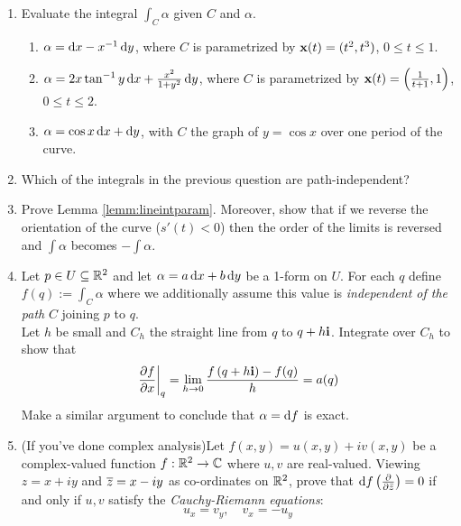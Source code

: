 \begin{exercises}
\begin{enumerate}
	  \item Evaluate the integral $\int_C\alpha$ given $C$ and $\alpha$.\vspace{-6pt}
	  \begin{enumerate}\itemsep2pt
	    \item $\alpha=\dx-x^{-1}\,\dy$, where $C$ is parametrized by $\vx(t)=(t^2,t^3)$, $0\le t\le 1$.
	    \item $\alpha=2x\tan^{-1}y\,\dx+\frac{x^2}{1+y^2}\,\dy$, where $C$ is parametrized by $\vx(t)=\left(\frac 1{t+1},1\right)$, $0\le t\le 2$.
	    \item $\alpha=\cos x\,\dx+\dy$, with $C$ the graph of $y=\cos x$ over one period of the curve.
		\end{enumerate}
	
	
		\item Which of the integrals in the previous question are path-independent?
	
	
		\item Prove Lemma \ref{lemm:lineintparam}. Moreover, show that if we reverse the orientation of the curve ($s'(t)<0$) then the order of the limits is reversed and $\int\alpha$ becomes $-\int\alpha$.
	
% 

	
		\item Let $p\in U\subseteq\R^2$ and let $\alpha=a\,\dx+b\,\dy$ be a 1-form on $U$. For each $q$ define $f(q):=\int_C\alpha$ where we additionally assume this value is \emph{independent of the path} $C$ joining $p$ to $q$.\\
		Let $h$ be small and $C_h$ the straight line from $q$ to $q+h\vi$. Integrate over $C_h$ to show that
		\[
			\partialsat[f]{x}{q}=\lim\limits_{h\to 0}\frac{f\left(q+h\vi\right)-f(q)}h=a(q)
		\]
		Make a similar argument to conclude that $\alpha=\df$ is exact.
	
	
		\item (If you've done complex analysis)\quad Let $f(x,y)=u(x,y)+iv(x,y)$ be a complex-valued function $f:\R^2\to\C$ where $u,v$ are real-valued. Viewing $z=x+iy$ and $\cl z=x-iy$ as co-ordinates on $\R^2$, prove that $\df\left(\partials{\bar z}\right)=0$ if and only if $u,v$ satisfy the \emph{Cauchy-Riemann equations}:
		\[
			u_x=v_y,\quad v_x=-u_y
		\]
\end{enumerate}
\end{exercises}

